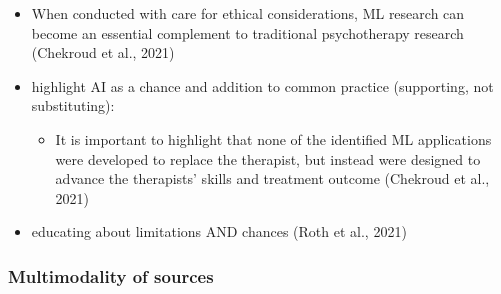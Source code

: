 \documentclass[
  man]{apa7}
\providecommand{\tightlist}{%
  \setlength{\itemsep}{0pt}\setlength{\parskip}{0pt}}
\begin{document}
\begin{itemize}
\tightlist
\item
  When conducted with care for ethical considerations, ML research can become an essential complement to traditional psychotherapy research (Chekroud et al., 2021)
\item
  highlight AI as a chance and addition to common practice (supporting, not substituting):

  \begin{itemize}
  \tightlist
  \item
    It is important to highlight that none of the identified ML applications were developed to replace the therapist, but instead were designed to advance the therapists' skills and treatment outcome (Chekroud et al., 2021)
  \end{itemize}
\item
  educating about limitations AND chances (Roth et al., 2021)
\end{itemize}

\hypertarget{multimodality-of-sources}{%
\subsubsection{Multimodality of sources}\label{multimodality-of-sources}}
\end{document}
